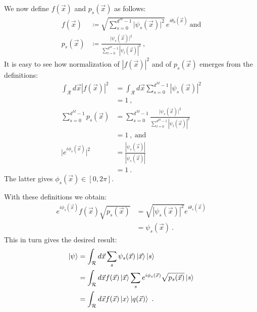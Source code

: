 \documentclass[draft,nofootinbib,pre,twocolumn,showpacs,showkeys,preprintnumbers,floatfix]{revtex4-1}
\newcommand{\1}{\mathbbm{1}}
\begin{document}
We now define $f(\vec{x})$ and $p_s(\vec{x})$ as follows:
\begin{align*}
f(\vec{x}) & \coloneqq \sqrt{\sum_{s=0}^{d^M-1} \vert \psi_s(\vec{x}) \vert^2}
  \, e^{i \theta_0(\vec{x})} ~\text{and} \\
p_s(\vec{x}) & \coloneqq
  \frac{\vert \psi_s(\vec{x})\vert^2}{\sum_{l=0}^{d^M-1}\left\vert \psi_l(\vec{x})\right\vert^2}
  ~,
\end{align*}
It is easy to see how normalization of $|f(\vec{x})|^2$ and of $p_s(\vec{x})$ emerges from the definitions:
\begin{align*}
\int_{\mathcal{R}} d\vec{x} \left\vert f(\vec{x})\right\vert^2
  & = \int_{\mathcal{R}} d\vec{x}
  \sum_{s=0}^{d^M-1} \left\vert \psi_s(\vec{x}) \right\vert^2 \\
  & = 1 ~,\\
\sum_{s=0}^{d^M-1} p_s(\vec{x})
  & = \sum_{s=0}^{d^M-1}
  \frac{\vert \psi_s(\vec{x})\vert^2}{\sum_{l=0}^{d^M-1}\left\vert
  \psi_l(\vec{x})\right\vert^2} \\
  & = 1 ~,~\text{and} \\
\vert e^{i\phi_s(\vec{x})}\vert^2
  & = \frac{|\psi_s(\vec{s})|}{|\psi_s(\vec{x})|} \\
  & = 1
  ~.
\end{align*}
The latter gives $\phi_s(\vec{x}) \in [0,2\pi]$.

With these definitions we obtain:
\begin{align*}
e^{i\phi_s(\vec{x})} f(\vec{x}) \sqrt{p_s(\vec{x})}
  & = \sqrt{|\psi_s(\vec{x})|^2} e^{i\theta_s(\vec{x})} \\
  & = \psi_s(\vec{x})
  ~.
\end{align*}
This in turn gives the desired result:
\begin{align*}
\ket{\psi} & = \int_{\mathcal{R}} d\vec{x} \sum_{s} \psi_s(\vec{x})\ket{\vec{x}} \ket{s} \\
& = \int_{\mathcal{R}} d\vec{x} f(\vec{x}) \ket{\vec{x}}\sum_{s} e^{i\phi_s(\vec{x})}   \sqrt{p_s(\vec{x})}  \ket{s} \\
& = \int_{\mathcal{R}}d\vec{x} f(\vec{x}) \ket{x}\ket{q(\vec{x})}
  ~.
\end{align*}

\end{document}
